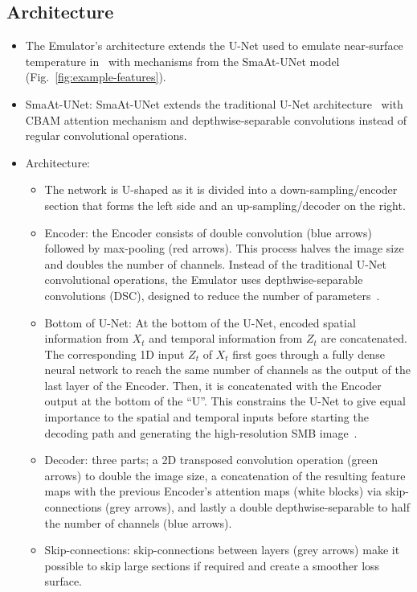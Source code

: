 \documentclass[a4paper,11pt,oneside]{report}
\begin{document}
\subsection{Architecture}\label{subsec:architecture}
\begin{itemize}
    \item The Emulator's architecture extends the U-Net used to emulate near-surface temperature in~\cite{Doury} with mechanisms from the SmaAt-UNet model~\cite{smatunet} (Fig.~\ref{fig:example-features}).
     \item SmaAt-UNet: SmaAt-UNet extends the traditional U-Net architecture~\cite{unet} with CBAM attention mechanism and depthwise-separable convolutions instead of regular convolutional operations. 
    \item Architecture: 
    \begin{itemize}
    \item The network is U-shaped as it is divided into a down-sampling/encoder section that forms the left side and an up-sampling/decoder on the right.
    \item Encoder: the Encoder consists of double convolution (blue arrows) followed by max-pooling (red arrows). This process halves the image size and doubles the number of channels. Instead of the traditional U-Net convolutional operations, the Emulator uses depthwise-separable convolutions (DSC), designed to reduce the number of parameters~\cite{smatunet}.
    \item Bottom of U-Net: At the bottom of the U-Net, encoded spatial information from $X_t$ and temporal information from $Z_t$ are concatenated. The corresponding 1D input $Z_t$ of $X_t$ first goes through a fully dense neural network to reach the same number of channels as the output of the last layer of the Encoder. Then, it is concatenated with the Encoder output at the bottom of the “U”. This constrains the U-Net to give equal importance to the spatial and temporal inputs before starting the decoding path and generating the high-resolution SMB image~\cite{Doury}. 
    \item Decoder: three parts; a 2D transposed convolution operation (green arrows) to double the image size, a concatenation of the resulting feature maps with the previous Encoder’s attention maps (white blocks) via skip-connections (grey arrows), and lastly a double depthwise-separable to half the number of channels (blue arrows). 
    \item Skip-connections: skip-connections between layers (grey arrows) make it possible to skip large sections if required and create a smoother loss surface. 

\end{itemize}
\end{itemize}
\end{document}
